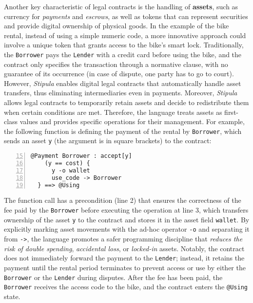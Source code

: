 Another key characteristic of legal contracts is the handling of \textbf{assets}, such as currency for 
\textit{payments} and \textit{escrows}, as well as tokens that can represent securities and provide digital 
ownership of physical goods. In the example of the bike rental, instead of using a simple numeric code, a 
more innovative approach could involve a unique token that grants access to the bike's smart lock. 
Traditionally, the \verb|Borrower| pays the \verb|Lender| with a credit card before using the bike, and the 
contract only specifies the transaction through a normative clause, with no guarantee of its occurrence (in 
case of dispute, one party has to go to court). However, \textit{Stipula} enables digital legal contracts 
that automatically handle asset transfers, thus eliminating intermediaries even in payments. Moreover, 
\textit{Stipula} allows legal contracts to temporarily retain assets and decide to redistribute them when 
certain conditions are met. Therefore, the language treats assets as first-class values and provides 
specific operations for their management. For example, the following function is defining the payment of 
the rental by \verb|Borrower|, which sends an asset \verb|y| (the argument is in square brackets) to the 
contract:

\begin{Verbatim}[numbers=left,xleftmargin=1cm,firstnumber=15,breaklines=true,breakanywhere=true,tabsize=2]
  @Payment Borrower : accept[y] 
    (y == cost) {
      y -o wallet
      use_code -> Borrower 
  } ==> @Using
\end{Verbatim}

The function call has a precondition (line 2) that ensures the correctness of the fee paid by the 
\verb|Borrower| before executing the operation at line 3, which transfers ownership of the asset \verb|y| 
to the contract and stores it in the asset field \verb|wallet|. By explicitly marking asset movements with 
the ad-hoc operator \verb|-o| and separating it from \verb|->|, the language promotes a safer programming 
discipline that \textit{reduces the risk of double spending}, \textit{accidental loss}, or 
\textit{locked-in} assets. Notably, the contract does not immediately forward the payment to the 
\verb|Lender|; instead, it retains the payment until the rental period terminates to prevent access or use 
by either the \verb|Borrower| or the \verb|Lender| during disputes. After the fee has been paid, the 
\verb|Borrower| receives the access code to the bike, and the contract enters the \verb|@Using| state.

